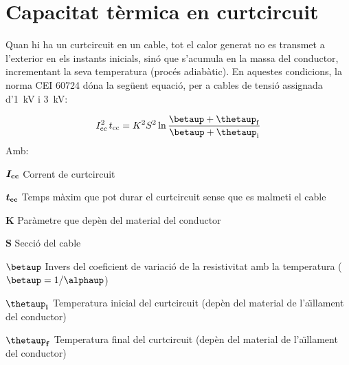 \section{Capacitat t\`{e}rmica en curtcircuit}\label{ces:cables_Icc_termica}

Quan hi ha un curtcircuit en un cable, tot el calor generat no es transmet a l'exterior en els instants inicials, sin\'{o} que s'acumula en la massa del conductor, incrementant la seva temperatura (proc\'{e}s adiab\`{a}tic). En aquestes condicions, la norma \textsf{CEI 60724} d\'{o}na la seg\"{u}ent equaci\'{o}, per a cables de tensi\'{o} assignada d'\SI{1}{kV} i \SI{3}{kV}:

\begin{equation}
   I\ped{cc}^2 \,t\ped{cc} = K^2 S^2 \ln \frac{\betaup + \thetaup\ped{f}}{\betaup + \thetaup\ped{i}}
\end{equation}
Amb:

\begin{list}{}
   {\setlength{\labelwidth}{10mm} \setlength{\leftmargin}{12mm} \setlength{\labelsep}{2mm}}
   \item[\hspace{5mm}$\boldsymbol{I_\mathrm{cc}}$\hfill] Corrent de curtcircuit
   \item[\hspace{5mm}$\boldsymbol{t_\mathrm{cc}}$\hfill] Temps m\`{a}xim que pot durar el curtcircuit sense que es malmeti el cable
   \item[\hspace{5mm}$\boldsymbol{K}$\hfill] Par\`{a}metre que dep\`{e}n del material del conductor
   \item[\hspace{5mm}$\boldsymbol{S}$\hfill] Secci\'{o} del cable
   \item[\hspace{5mm}$\boldsymbol{\betaup}$\hfill] Invers del coeficient de variaci\'{o} de la resistivitat amb la temperatura ($\betaup = 1/ \alphaup$)
   \item[\hspace{5mm}$\boldsymbol{\thetaup\ped{i}}$\hfill] Temperatura inicial del curtcircuit (dep\`{e}n del material de l'a\"{\i}llament del conductor)
   \item[\hspace{5mm}$\boldsymbol{\thetaup\ped{f}}$\hfill] Temperatura final del curtcircuit (dep\`{e}n del material de l'a\"{\i}llament del conductor)
\end{list}

